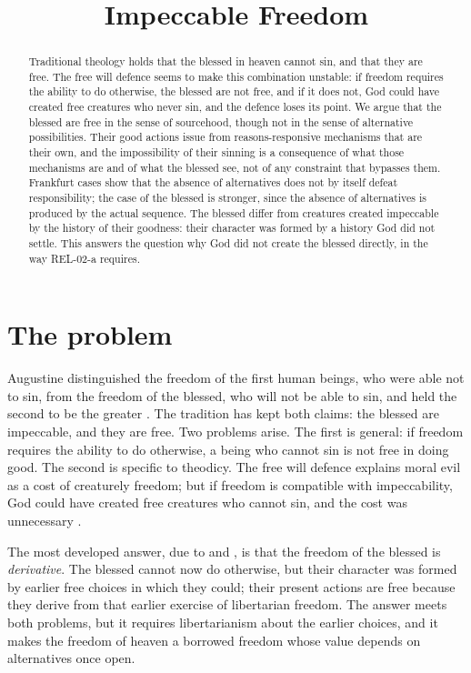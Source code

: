 \documentclass{situationist-preprint}
\title{Impeccable Freedom}
\begin{document}
\maketitle

\begin{abstract}
Traditional theology holds that the blessed in heaven cannot sin, and that they are free. The free will defence seems to make this combination unstable: if freedom requires the ability to do otherwise, the blessed are not free, and if it does not, God could have created free creatures who never sin, and the defence loses its point. We argue that the blessed are free in the sense of sourcehood, though not in the sense of alternative possibilities. Their good actions issue from reasons-responsive mechanisms that are their own, and the impossibility of their sinning is a consequence of what those mechanisms are and of what the blessed see, not of any constraint that bypasses them. Frankfurt cases show that the absence of alternatives does not by itself defeat responsibility; the case of the blessed is stronger, since the absence of alternatives is produced by the actual sequence. The blessed differ from creatures created impeccable by the history of their goodness: their character was formed by a history God did not settle. This answers the question why God did not create the blessed directly, in the way REL-02-a requires.
\end{abstract}

\section{The problem}

Augustine distinguished the freedom of the first human beings, who were able not to sin, from the freedom of the blessed, who will not be able to sin, and held the second to be the greater \citep[XXII.30]{AugustineCiv}. The tradition has kept both claims: the blessed are impeccable, and they are free. Two problems arise. The first is general: if freedom requires the ability to do otherwise, a being who cannot sin is not free in doing good. The second is specific to theodicy. The free will defence explains moral evil as a cost of creaturely freedom; but if freedom is compatible with impeccability, God could have created free creatures who cannot sin, and the cost was unnecessary \citep{Sennett1999,PawlTimpe2009}.

The most developed answer, due to \citet{Sennett1999} and \citet{PawlTimpe2009}, is that the freedom of the blessed is \emph{derivative}. The blessed cannot now do otherwise, but their character was formed by earlier free choices in which they could; their present actions are free because they derive from that earlier exercise of libertarian freedom. The answer meets both problems, but it requires libertarianism about the earlier choices, and it makes the freedom of heaven a borrowed freedom whose value depends on alternatives once open.
\end{document}
